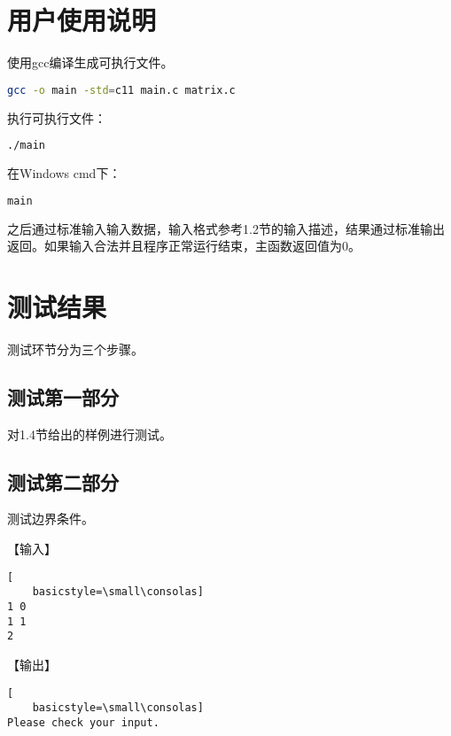 \documentclass{article}
\begin{document}
\section{用户使用说明}

使用gcc编译生成可执行文件。

\begin{lstlisting}[language={bash},
    basicstyle=\small\consolas]
gcc -o main -std=c11 main.c matrix.c
\end{lstlisting}

执行可执行文件：

\begin{lstlisting}[language={bash},
    basicstyle=\small\consolas]
./main
\end{lstlisting}

在Windows cmd下：

\begin{lstlisting}[language={bash},
    basicstyle=\small\consolas]
main
\end{lstlisting}

之后通过标准输入输入数据，输入格式参考1.2节的输入描述，结果通过标准输出返回。如果输入合法并且程序正常运行结束，主函数返回值为0。

\section{测试结果}

测试环节分为三个步骤。

\subsection{测试第一部分}

对1.4节给出的样例进行测试。

\subsection{测试第二部分}

测试边界条件。

【输入】

\begin{lstlisting}[
    basicstyle=\small\consolas]
1 0
1 1
2
\end{lstlisting}

【输出】

\begin{lstlisting}[
    basicstyle=\small\consolas]
Please check your input.
\end{lstlisting}
\end{document}
